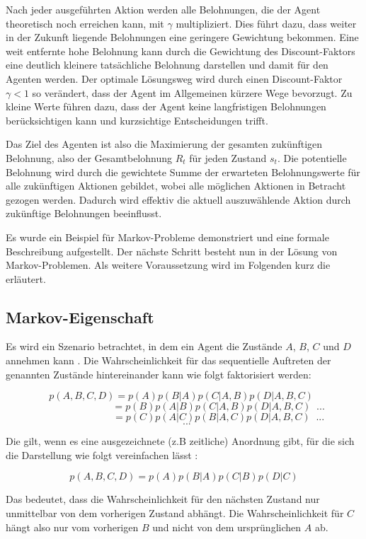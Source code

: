 Nach jeder ausgeführten Aktion werden alle Belohnungen, die der Agent theoretisch noch erreichen kann, mit $\gamma$ multipliziert. Dies führt dazu, dass weiter in der Zukunft liegende Belohnungen eine geringere Gewichtung bekommen. Eine weit entfernte hohe Belohnung kann durch die Gewichtung des Discount-Faktors eine deutlich kleinere tatsächliche Belohnung darstellen und damit für den Agenten  werden. Der optimale Lösungsweg wird durch einen Discount-Faktor $\gamma < 1$ so  verändert, dass der Agent im Allgemeinen kürzere Wege bevorzugt. Zu kleine Werte führen dazu, dass der Agent keine langfristigen Belohnungen berücksichtigen kann und kurzsichtige Entscheidungen trifft.

Das Ziel des Agenten ist also die Maximierung der gesamten zukünftigen Belohnung, also der Gesamtbelohnung $R_t$ für jeden Zustand $s_t$. Die potentielle Belohnung wird durch die gewichtete Summe der erwarteten Belohnungswerte für alle zukünftigen Aktionen gebildet, wobei alle möglichen Aktionen in Betracht gezogen werden. Dadurch wird effektiv die aktuell auszuwählende Aktion durch zukünftige Belohnungen beeinflusst.

Es wurde ein Beispiel für Markov-Probleme demonstriert und eine formale Beschreibung aufgestellt. Der nächste Schritt besteht nun in der Lösung von Markov-Problemen. Als weitere Voraussetzung wird im Folgenden kurz die  erläutert.



\subsection{Markov-Eigenschaft}
Es wird ein Szenario betrachtet, in dem ein Agent die Zustände $A$, $B$, $C$ und $D$ annehmen kann \cite{markov_property_example}. Die Wahrscheinlichkeit für das sequentielle Auftreten der genannten Zustände hintereinander kann wie folgt faktorisiert werden:

$$ p(A,B,C,D) = p(A) p(B|A) p(C|A,B) p(D|A,B,C)   \;\; $$
$$ \;\;\;\;\;\;\;\;\;\;\;\;\;\;\;\;\;\;\;\;\;\;\;\;\; = p(B) p(A|B) p(C|A,B) p(D|A,B,C)   \;\; ... $$
$$ \;\;\;\;\;\;\;\;\;\;\;\;\;\;\;\;\;\;\;\;\;\;\;\;\; = p(C) p(A|C) p(B|A,C) p(D|A,B,C)   \;\; ... $$
$$ \;\; ... $$

Die  gilt, wenn es eine ausgezeichnete (z.B zeitliche) Anordnung gibt, für die sich die Darstellung wie folgt vereinfachen lässt \cite{markov_property_example}:

$$ p(A,B,C,D)  = p(A) p(B|A) p(C|B) p(D|C) $$

Das bedeutet, dass die Wahrscheinlichkeit für den nächsten Zustand nur unmittelbar von dem vorherigen Zustand abhängt. Die Wahrscheinlichkeit für $C$ hängt also nur vom vorherigen $B$ und nicht von dem ursprünglichen $A$ ab.
